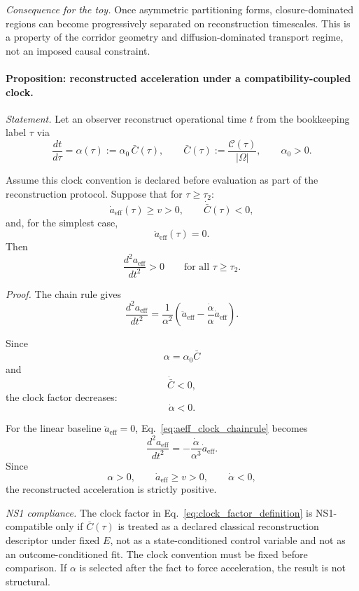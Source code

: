 \documentclass[aps,prx,onecolumn,11pt]{revtex4-2}
\theoremstyle{plain}
\theoremstyle{definition}
\theoremstyle{remark}
\begin{document}
\emph{Consequence for the toy.}
Once asymmetric partitioning forms, closure-dominated regions can
become progressively separated on reconstruction timescales. This is a
property of the corridor geometry and diffusion-dominated transport
regime, not an imposed causal constraint.


\paragraph{Proposition: reconstructed acceleration under a compatibility-coupled clock.}

\emph{Statement.}
Let an observer reconstruct operational time \(t\) from the bookkeeping
label \(\tau\) via
\begin{equation}
\frac{dt}{d\tau}
=
\alpha(\tau)
:=
\alpha_0\,\bar C(\tau),
\qquad
\bar C(\tau)
:=
\frac{\mathcal C(\tau)}{|\Omega|},
\qquad
\alpha_0>0.
\label{eq:clock_factor_definition}
\end{equation}

Assume this clock convention is declared before evaluation as part of
the reconstruction protocol. Suppose that for \(\tau\geq\tau_2\):
\[
\dot a_{\mathrm{eff}}(\tau)\geq v>0,
\qquad
\dot{\bar C}(\tau)<0,
\]
and, for the simplest case,
\[
\ddot a_{\mathrm{eff}}(\tau)=0.
\]
Then
\begin{equation}
\frac{d^2a_{\mathrm{eff}}}{dt^2}>0
\qquad
\text{for all }\tau\geq\tau_2.
\end{equation}

\emph{Proof.}
The chain rule gives
\begin{equation}
\frac{d^2a_{\mathrm{eff}}}{dt^2}
=
\frac{1}{\alpha^2}
\left(
\ddot a_{\mathrm{eff}}
-
\frac{\dot\alpha}{\alpha}
\dot a_{\mathrm{eff}}
\right).
\label{eq:aeff_clock_chainrule}
\end{equation}

Since
\[
\alpha=\alpha_0\bar C
\]
and
\[
\dot{\bar C}<0,
\]
the clock factor decreases:
\[
\dot\alpha<0.
\]

For the linear baseline \(\ddot a_{\mathrm{eff}}=0\),
Eq.~\eqref{eq:aeff_clock_chainrule} becomes
\[
\frac{d^2a_{\mathrm{eff}}}{dt^2}
=
-\frac{\dot\alpha}{\alpha^3}
\dot a_{\mathrm{eff}}.
\]
Since
\[
\alpha>0,
\qquad
\dot a_{\mathrm{eff}}\geq v>0,
\qquad
\dot\alpha<0,
\]
the reconstructed acceleration is strictly positive.

\emph{NS1 compliance.}
The clock factor in Eq.~\eqref{eq:clock_factor_definition} is
NS1-compatible only if \(\bar C(\tau)\) is treated as a declared
classical reconstruction descriptor under fixed \(E\), not as a
state-conditioned control variable and not as an outcome-conditioned
fit. The clock convention must be fixed before comparison. If
\(\alpha\) is selected after the fact to force acceleration, the result
is not structural.
\end{document}
